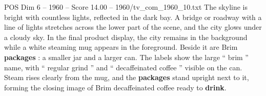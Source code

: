 \begin{textsample}{POS Dim 6 – 1960 – Score 14.00 – 1960/tv\_com\_1960\_10.txt}
The skyline is bright with countless lights, reflected in the dark bay.
A bridge or roadway with a line of lights stretches across the lower part of the scene, and the city glows under a cloudy sky.
In the final product display, the city remains in the background while a white steaming mug appears in the foreground.
Beside it are Brim \textbf{packages} : a smaller jar and a larger can.
The labels show the large “ brim ” name, with “ regular grind ” and “ decaffeinated coffee ” visible on the can.
Steam rises clearly from the mug, and the \textbf{packages} stand upright next to it, forming the closing image of Brim decaffeinated coffee ready to \textbf{drink}.

\end{textsample}

